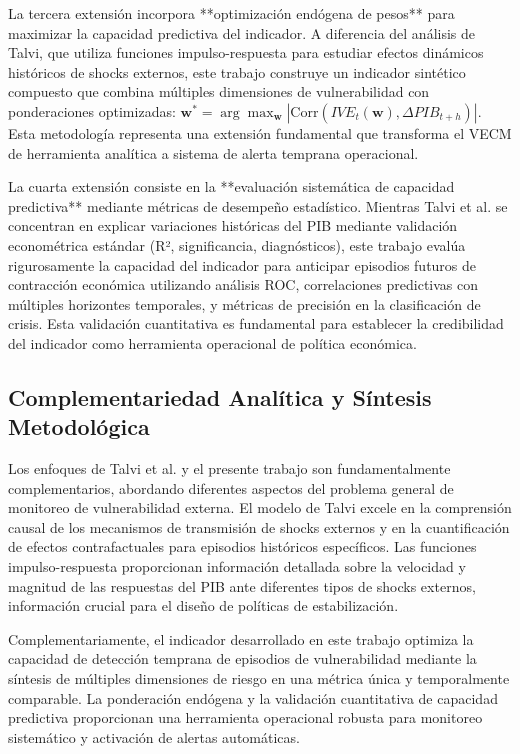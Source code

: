 \documentclass[3p,11pt]{elsarticle}
\begin{document}
La tercera extensión incorpora **optimización endógena de pesos** para maximizar la capacidad predictiva del indicador. A diferencia del análisis de Talvi, que utiliza funciones impulso-respuesta para estudiar efectos dinámicos históricos de shocks externos, este trabajo construye un indicador sintético compuesto que combina múltiples dimensiones de vulnerabilidad con ponderaciones optimizadas: $\mathbf{w}^* = \arg\max_{\mathbf{w}} |\text{Corr}(IVE_t(\mathbf{w}), \Delta PIB_{t+h})|$. Esta metodología representa una extensión fundamental que transforma el VECM de herramienta analítica a sistema de alerta temprana operacional.

La cuarta extensión consiste en la **evaluación sistemática de capacidad predictiva** mediante métricas de desempeño estadístico. Mientras Talvi et al. se concentran en explicar variaciones históricas del PIB mediante validación econométrica estándar (R², significancia, diagnósticos), este trabajo evalúa rigurosamente la capacidad del indicador para anticipar episodios futuros de contracción económica utilizando análisis ROC, correlaciones predictivas con múltiples horizontes temporales, y métricas de precisión en la clasificación de crisis. Esta validación cuantitativa es fundamental para establecer la credibilidad del indicador como herramienta operacional de política económica.

\subsection{Complementariedad Analítica y Síntesis Metodológica}

Los enfoques de Talvi et al. y el presente trabajo son fundamentalmente complementarios, abordando diferentes aspectos del problema general de monitoreo de vulnerabilidad externa. El modelo de Talvi excele en la comprensión causal de los mecanismos de transmisión de shocks externos y en la cuantificación de efectos contrafactuales para episodios históricos específicos. Las funciones impulso-respuesta proporcionan información detallada sobre la velocidad y magnitud de las respuestas del PIB ante diferentes tipos de shocks externos, información crucial para el diseño de políticas de estabilización.

Complementariamente, el indicador desarrollado en este trabajo optimiza la capacidad de detección temprana de episodios de vulnerabilidad mediante la síntesis de múltiples dimensiones de riesgo en una métrica única y temporalmente comparable. La ponderación endógena y la validación cuantitativa de capacidad predictiva proporcionan una herramienta operacional robusta para monitoreo sistemático y activación de alertas automáticas.
\end{document}
